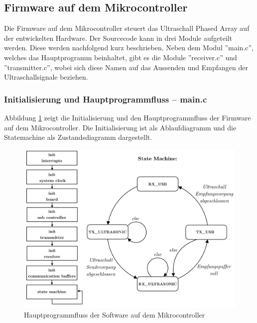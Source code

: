 \clearpage
\subsection{Firmware auf dem Mikrocontroller}\label{sec:firmware_auf_dem_mikrocontroller}
Die Firmware auf dem Mikrocontroller steuert das Ultraschall Phased Array auf der entwickelten Hardware. Der Sourcecode kann in drei Module aufgeteilt werden. Diese werden nachfolgend kurz beschrieben. Neben dem Modul ''main.c'', welches das Hauptprogramm beinhaltet, gibt es die Module ''receiver.c'' und ''transmitter.c'', wobei sich diese Namen auf das Aussenden und Empfangen der Ultraschallsignale beziehen.

\subsubsection{Initialisierung und Hauptprogrammfluss -- main.c}\label{sec:initialisierung_und_hauptprogrammfluss}

Abbildung \ref{fig:image_software_microcontroller} zeigt die Initialisierung und den Hauptprogrammfluss der Firmware auf dem Mikrocontroller. Die Initialisierung ist als Ablaufdiagramm und die Statemachine als Zustandsdiagramm dargestellt.

\begin{figure}[htb]
\begin{center}
\includegraphics[width=\textwidth]{graphics/image_software_microcontroller.png}
\end{center}
\caption{Hauptprogrammfluss der Software auf dem Mikrocontroller} %
\label{fig:image_software_microcontroller}
\end{figure}
%

